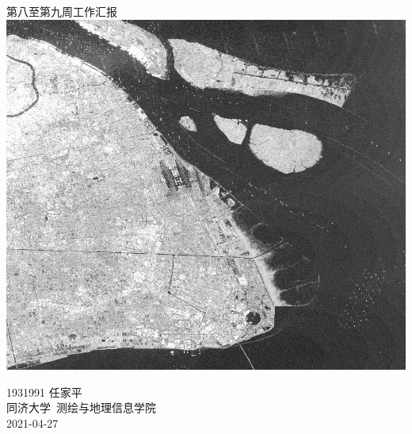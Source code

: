 \documentclass[a4paper, 12pt]{article}
\begin{document}
\begin{center}
    {\Huge 
        第八至第九周工作汇报}\\[20pt]
    
    \includegraphics[scale=0.6]{pic/cover.jpg}  

    {\Large 
        1931991 任家平\\[12pt]
        同济大学~测绘与地理信息学院\\[12pt]
        2021-04-27}
\end{center}
\thispagestyle{empty}



\newpage
{}
\tableofcontents
\newpage
{}




\listoffigures
{}
\listoftables
{}
\newpage
\nocite{*}


\end{document}
